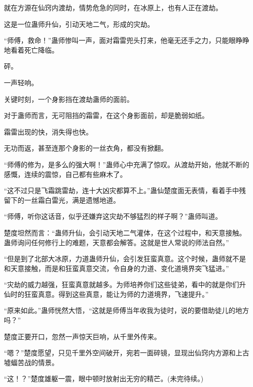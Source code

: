 \begin{this_body}
就在方源在仙窍内渡劫，情势危急的同时，在冰原上，也有人正在渡劫。

这是一位蛊师升仙，引动天地二气，形成的灾劫。

“师傅，救命！”蛊师惨叫一声，面对霜雷兜头打来，他毫无还手之力，只能眼睁睁地看着死亡降临。

砰。

一声轻响。

关键时刻，一个身影挡在渡劫蛊师的面前。

对于蛊师而言，无可阻挡的霜雷，在这个身影面前，却是脆弱如纸。

霜雷出现的快，消失得也快。

无功而返，甚至连那个身影的一丝衣角，都没有掀翻。

“师傅的修为，是多么的强大啊！”蛊师心中充满了惊叹。从渡劫开始，他就不断的感慨，连续的震惊，自己都有些麻木了。

“这不过只是飞霜跳雷劫，连十大凶灾都算不上。”蛊仙楚度面无表情，看着手中残留下的一丝霜白雷光，满是遗憾地道。

“师傅，听你这话音，似乎还嫌弃这灾劫不够猛烈的样子啊？”蛊师叫道。

楚度坦然而言：“蛊师升仙，会引动天地二气灌体，在这个过程中，和天意接触。蛊师询问任何修行上的难题，天意都会解答。这就是世人常说的师法自然。”

“但是到了北部大冰原，力道蛊师升仙，会引发狂蛮真意。这个时候，蛊师就不是和天意接触，而是和狂蛮真意交流，令自身的力道、变化道境界突飞猛进。”

“灾劫的威力越强，狂蛮真意就越多。为师培养你们这些徒弟，看中的就是你们升仙时的狂蛮真意。得到这些真意，能让为师的力道境界，飞速提升。”

“原来如此。”蛊师恍然大悟，“这就是师傅当年收我为徒时，说的要借助徒儿的地方吗？”

楚度正要开口，忽然一声惊天巨响，从千里外传来。

“嗯？”楚度愿望，只见千里外空间破开，宛若一面碎镜，显现出仙窍内方源和上古墟蝠苦战的情景。

“这！？”楚度雄躯一震，眼中顿时放射出无穷的精芒。(未完待续。)

\end{this_body}

